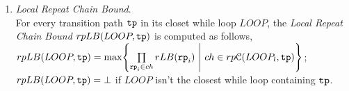 \begin{enumerate}
\begin{enumerate}
\item  \emph{Local Repeat Chain Bound}.
\\
For every transition path $\mathtt{tp}$ in its closet while loop $LOOP$, the \emph{Local Repeat Chain Bound} $rpLB(LOOP, \mathtt{tp})$ is computed as follows,
  \\
  $rpLB(LOOP, \tpath) = \max \left\{ \prod\limits_{\rprog_i \in ch}  rLB(\rprog_i) 
  ~\middle\vert~ ch \in rp\mathcal{C}(LOOP_l, \tpath) \right\}
  $;
  \\
  $rpLB(LOOP, \mathtt{tp}) = \bot
  $ if $LOOP$ isn't the closest while loop containing $\mathtt{tp}$.
  \end{enumerate}

\end{enumerate}
